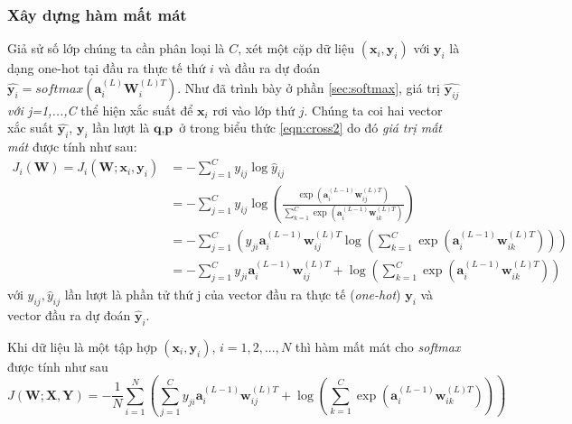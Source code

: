 \subsubsection{Xây dựng hàm mất mát}
\hspace{5mm} Giả sử số lớp chúng ta cần phân loại là $C$, xét một cặp dữ liệu $(\textbf{x}_i,\textbf{y}_i)$ với $\textbf{y}_i$ là dạng one-hot tại đầu ra thực tế thứ $i$ và đầu ra dự đoán $\widehat{\textbf{y}_i} = softmax(\textbf{a}^{(L)}_i\textbf{W}^{(L)T}_i)$. Như đã trình bày ở phần \ref{sec:softmax}, giá trị $\widehat{\textbf{y}_{ij}}$\textit{ với j=1,...,C} thể hiện xắc suất để $\textbf{x}_i$ rơi vào lớp thứ $j$. Chúng ta coi  hai vector xắc suất $\widehat{\textbf{y}_{i}}$, $\textbf{y}_i$ lần lượt là $\textbf{q},\textbf{p}$ ở trong biểu thức \ref{eqn:cross2} do đó \textit{giá trị mất mát} được tính như sau:
\begin{equation}
\label{eq:cost1}
\begin{split}
J_i(\textbf{W}) = J_i(\textbf{W};\textbf{x}_i,\textbf{y}_i) &=-\sum_{j=1}^C y_{ij} \log \widehat{y}_{ij}	\\
&= -\sum_{j = 1}^C y_{ij}\log\left(\frac{\exp(\textbf{a}^{(L-1)}_i\textbf{w}^{(L)T}_{ij})}{\sum_{k=1}^C \exp(\textbf{a}^{(L-1)}_{i}\textbf{w}^{(L)T}_{ik})}\right)\\
&= -\sum_{j=1}^C\left(y_{ji} \textbf{a}^{(L-1)}_i\textbf{w}^{(L)T}_{ij}\log\left(\sum_{k=1}^C \exp(\textbf{a}^{(L-1)}_i\textbf{w}^{(L)T}_{ik})\right)\right) \\
&= -\sum_{j=1}^C y_{ji} \textbf{a}^{(L-1)}_i\textbf{w}^{(L)T}_{ij} + \log\left(\sum_{k=1}^C \exp(\textbf{a}^{(L-1)}_i\textbf{w}^{(L)T}_{ik})\right) 
\end{split}
\end{equation}
với  $y_{ij}, \widehat{y}_{ij}$ lần lượt là phần tử thứ j của vector đầu ra thực tế (\textit{one-hot}) $\textbf{y}_i$ và vector đầu ra dự đoán $\widehat{\textbf{y}}_i$. \par

Khi dữ liệu là một tập hợp $(\textbf{x}_i,\textbf{y}_i)$, $i=1,2,...,N$ thì hàm mất mát cho \textit{softmax} được tính như sau
\begin{equation}
\label{eq:cost2}
J(\textbf{W};\textbf{X},\textbf{Y}) = -\frac{1}{N} \sum_{i=1}^N \left(  \sum_{j=1}^C y_{ji} \textbf{a}^{(L-1)}_i\textbf{w}^{(L)T}_{ij} + \log\left(\sum_{k=1}^C \exp(\textbf{a}^{(L-1)}_i\textbf{w}^{(L)T}_{ik})\right) \right)
\end{equation} 


